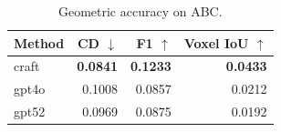 \begin{table}[t]
\centering
\caption{Geometric accuracy on ABC.}
\label{tab:geometric_abc}
\begin{tabular}{lrrr}
\toprule
Method & CD $\downarrow$ & F1 $\uparrow$ & Voxel IoU $\uparrow$ \\
\midrule
craft & \textbf{0.0841} & \textbf{0.1233} & \textbf{0.0433} \\
gpt4o & 0.1008 & 0.0857 & 0.0212 \\
gpt52 & 0.0969 & 0.0875 & 0.0192 \\
\bottomrule
\end{tabular}
\end{table}
